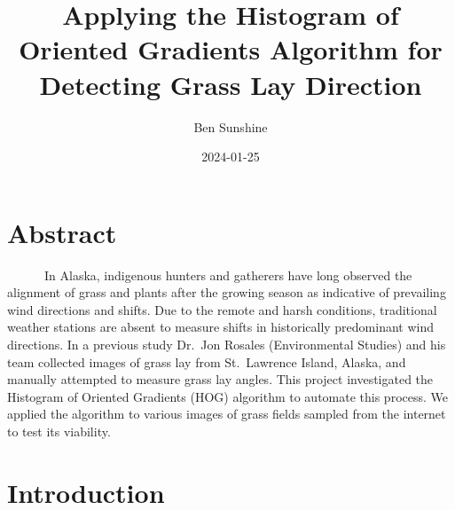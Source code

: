 \documentclass[
  letterpaper,
  DIV=11,
  numbers=noendperiod]{scrreprt}
\title{Applying the Histogram of Oriented Gradients Algorithm for
Detecting Grass Lay Direction}
\author{Ben Sunshine}
\date{2024-01-25}
\renewcommand*\contentsname{Table of contents}
\newcommand\contentsname{Table of contents}
\begin{document}
\maketitle
\ifdefined\Shaded\renewenvironment{Shaded}{\begin{tcolorbox}[enhanced, boxrule=0pt, breakable, interior hidden, sharp corners, frame hidden, borderline west={3pt}{0pt}{shadecolor}]}{\end{tcolorbox}}\fi

\renewcommand*\contentsname{Table of contents}
{
\hypersetup{linkcolor=}
\setcounter{tocdepth}{2}
\tableofcontents
}

\hypertarget{abstract}{%
\chapter{Abstract}\label{abstract}}

~~~~~~In Alaska, indigenous hunters and gatherers have long observed the
alignment of grass and plants after the growing season as indicative of
prevailing wind directions and shifts. Due to the remote and harsh
conditions, traditional weather stations are absent to measure shifts in
historically predominant wind directions. In a previous study Dr.~Jon
Rosales (Environmental Studies) and his team collected images of grass
lay from St.~Lawrence Island, Alaska, and manually attempted to measure
grass lay angles. This project investigated the Histogram of Oriented
Gradients (HOG) algorithm to automate this process. We applied the
algorithm to various images of grass fields sampled from the internet to
test its viability.


\hypertarget{introduction}{%
\chapter{Introduction}\label{introduction}}
\end{document}
